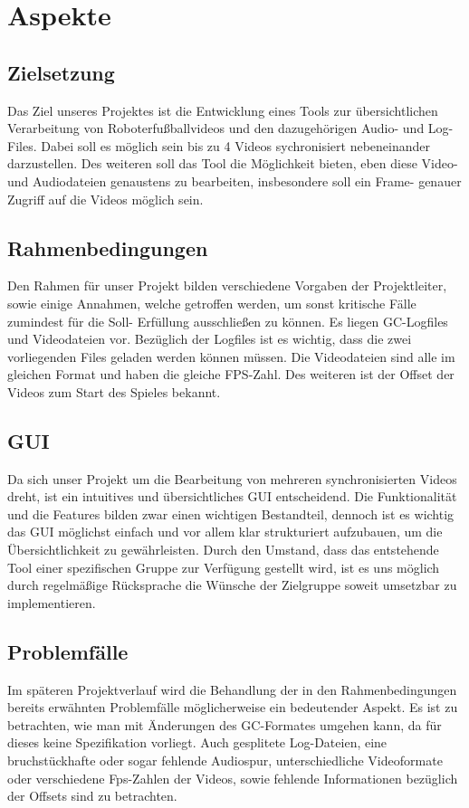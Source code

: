 \chapter{Aspekte}
\section{Zielsetzung}
Das Ziel unseres Projektes ist die Entwicklung eines Tools zur übersichtlichen Verarbeitung von Roboterfußballvideos und den dazugehörigen Audio- und Log-Files. Dabei soll es möglich sein bis zu 4 Videos sychronisiert nebeneinander darzustellen. Des weiteren soll das Tool die Möglichkeit bieten, eben diese Video- und Audiodateien genaustens zu bearbeiten, insbesondere soll ein Frame- genauer Zugriff auf die Videos möglich sein. 
\section{Rahmenbedingungen}
Den Rahmen für unser Projekt bilden verschiedene Vorgaben der Projektleiter, sowie einige Annahmen, welche getroffen werden, um sonst kritische Fälle zumindest für die Soll- Erfüllung ausschließen zu können. Es liegen GC-Logfiles und Videodateien vor. Bezüglich der Logfiles ist es wichtig, dass die zwei vorliegenden Files geladen werden können müssen. Die Videodateien sind alle im gleichen Format und haben die gleiche FPS-Zahl. Des weiteren ist der Offset der Videos zum Start des Spieles bekannt.
\section{GUI}
Da sich unser Projekt um die Bearbeitung von mehreren synchronisierten Videos dreht, ist ein intuitives und übersichtliches GUI entscheidend. Die Funktionalität und die Features bilden zwar einen wichtigen Bestandteil, dennoch ist es wichtig das GUI möglichst einfach und vor allem klar strukturiert aufzubauen, um die Übersichtlichkeit zu gewährleisten. Durch den Umstand, dass das entstehende Tool einer spezifischen Gruppe zur Verfügung gestellt wird, ist es uns möglich durch regelmäßige Rücksprache die Wünsche der Zielgruppe soweit umsetzbar zu implementieren.
\section{Problemfälle}
Im späteren Projektverlauf wird die Behandlung der in den Rahmenbedingungen bereits erwähnten Problemfälle möglicherweise ein bedeutender Aspekt. Es ist zu betrachten, wie man mit Änderungen des GC-Formates umgehen kann, da für dieses keine Spezifikation vorliegt. Auch gesplitete Log-Dateien, eine bruchstückhafte oder sogar fehlende Audiospur, unterschiedliche Videoformate oder verschiedene Fps-Zahlen der Videos, sowie fehlende Informationen bezüglich der Offsets sind zu betrachten.
